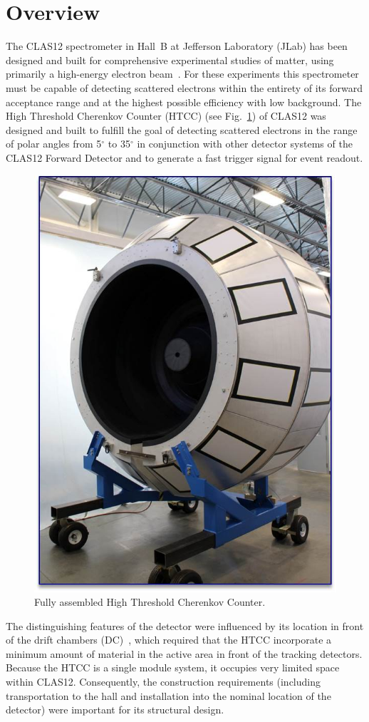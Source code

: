 \section{Overview}

The CLAS12 spectrometer in Hall~B at Jefferson Laboratory (JLab) has been designed and built for
comprehensive experimental studies of matter, using primarily a high-energy electron beam~\cite{clas12-nim}.
For these experiments this spectrometer must be capable of detecting scattered electrons within the entirety
of its forward acceptance range and at the highest possible efficiency with low background. The High
Threshold Cherenkov Counter (HTCC) (see Fig.~\ref{fig:Picture1}) of CLAS12 was designed and built to fulfill
the goal of detecting scattered electrons in the range of polar angles from 5$^\circ$ to 35$^\circ$ in
conjunction with other detector systems of the CLAS12 Forward Detector and to generate a fast trigger signal
for event readout.

\begin{figure}[ht]
    \centering
    \includegraphics[width=0.75\linewidth]{images/Picture1.jpg}
    \caption{Fully assembled High Threshold Cherenkov Counter.}
    \label{fig:Picture1}
\end{figure}
The distinguishing features of the detector were influenced by its location in front of the drift chambers
(DC)~\cite{dc-nim}, which required that the HTCC incorporate a minimum amount of material in the active
area in front of the tracking detectors. Because the HTCC is a single module system, it occupies very limited
space within CLAS12. Consequently, the construction requirements (including transportation to the hall and
installation into the nominal location of the detector) were important for its structural design. 

